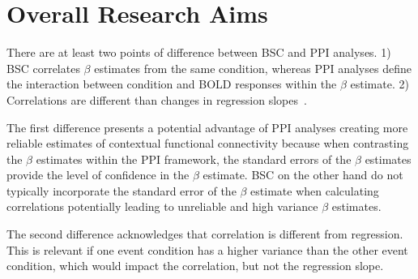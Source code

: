 \documentclass[phd,appendix,figures]{uithesis}
\begin{document}
\section{Overall Research Aims}
There are at least two points of difference between BSC and PPI analyses.
1) BSC correlates $\beta$ estimates from the same condition, whereas PPI analyses define
the interaction between condition and BOLD responses within the $\beta$ estimate.
2) Correlations are different than changes in regression slopes~\cite{Di2019}.

The first difference presents a potential advantage of PPI analyses creating more reliable
estimates of contextual functional connectivity because when contrasting the $\beta$ estimates
within the PPI framework, the standard errors of the $\beta$ estimates provide the level of
confidence in the $\beta$ estimate.
BSC on the other hand do not typically incorporate the standard error of the $\beta$ estimate
when calculating correlations potentially leading to unreliable and high variance $\beta$
estimates.

The second difference acknowledges that correlation is different from regression.
This is relevant if one event condition has a higher variance than the other event condition,
which would impact the correlation, but not the regression slope.
\end{document}
